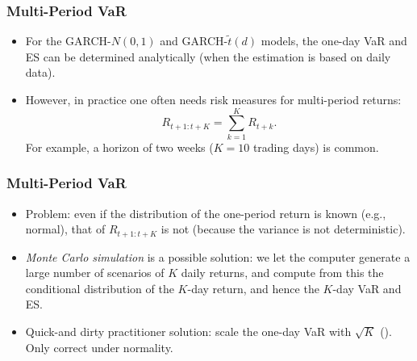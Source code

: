 \begin{frame}%

\frametitle{Multi-Period VaR}

\begin{itemize}
\item For the GARCH-$N(0,1)$ and GARCH-$\tilde{t}(d)$ models, the one-day
VaR and ES can be determined analytically (when the estimation is based on
daily data).

\item However, in practice one often needs risk measures for multi-period
returns:%
\begin{equation*}
R_{t+1:t+K}=\sum_{k=1}^{K}R_{t+k}.
\end{equation*}%
For example, a horizon of two weeks ($K=10$ trading days) is common.
\end{itemize}
\end{frame}
\begin{frame}
\frametitle{Multi-Period VaR}
\begin{itemize}
\item Problem: even if the distribution of the one-period return is known (e.g., normal), that of $R_{t+1:t+K}$ is not (because the variance is not deterministic).
\item \emph{\color{red}Monte Carlo simulation} is a possible solution:
we let the computer generate a large number of scenarios of $K$ daily
returns, and compute from this the conditional distribution of the $K$-day
return, and hence the $K$-day VaR and ES.
\item Quick-and dirty practitioner solution: scale the one-day VaR with $\sqrt{K}$ (). Only correct under normality.
\end{itemize}

\end{frame}%

